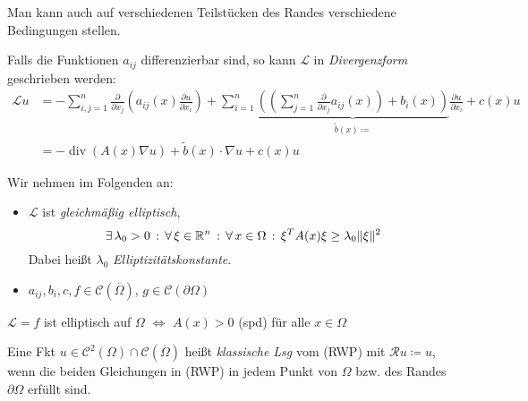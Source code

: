 \documentclass{cheat-sheet}
\newcommand{\Cont}{\mathcal{C}} %
\newcommand{\clos}[1]{\overline{#1}} %
\newcommand{\cOmega}{\clos{\Omega}} %
\newcommand{\bOmega}{\partial \Omega} %
\newcommand{\LL}{\mathcal{L}} %
\newcommand{\RR}{\mathcal{R}} %
\DeclareMathOperator{\dive}{div} %
\begin{document}
\begin{bem}
  Man kann auch auf verschiedenen Teilstücken des Randes verschiedene Bedingungen stellen.
\end{bem}

\begin{bem}
  Falls die Funktionen $a_{ij}$ differenzierbar sind, so kann $\LL$ in \emph{Divergenzform} geschrieben werden:
  \begin{align*}
    \LL u & = - \!\!\! \sum_{i,j=1}^n \tfrac{\partial}{\partial x_j} \left( a_{ij}(x) \tfrac{\partial u}{\partial x_i} \right) \!+\! \sum_{i=1}^n \underbrace{\left((\sum_{j=1}^n \tfrac{\partial}{\partial x_j} a_{ij}(x) ) \!+\! b_i(x)\right)}_{\tilde{b}(x) \coloneqq} \tfrac{\partial u}{\partial x_i} \!+\! c(x) u \\
    & = - \dive(A(x) \nabla u) + \tilde{b}(x) \cdot \nabla u + c(x) u
  \end{align*}
\end{bem}

\begin{voraussetzung}
  Wir nehmen im Folgenden an:
  \begin{itemize}
    \item $\LL$ ist \emph{gleichmäßig elliptisch}, \dh{}
    \[ \exists \, {\lambda_0 > 0} \,:\, \forall \, {\xi \in \mathbb{R}^n} \,:\, \forall \, {x \in \Omega} \,:\, \xi^T A(x) \xi \geq \lambda_0 \lVert\xi\rVert^2 \]
    Dabei heißt $\lambda_0$ \emph{Elliptizitätskonstante}.
    \item $a_{ij}, b_i, c, f \in \Cont(\cOmega)$, $g \in \Cont(\bOmega)$
  \end{itemize}
\end{voraussetzung}

\begin{bem}
  $\LL = f$ ist elliptisch auf $\Omega$ $\iff$ $A(x) > 0$ (spd) für alle $x \in \Omega$
\end{bem}

\begin{defn}
  Eine Fkt $u \in \Cont^2(\Omega) \cap \Cont(\cOmega)$ heißt \emph{klassische Lsg} vom (RWP) mit $\RR u \coloneqq u$, wenn die beiden Gleichungen in (RWP) in jedem Punkt von $\Omega$ bzw. des Randes $\bOmega$ erfüllt sind.
\end{defn}
\end{document}
